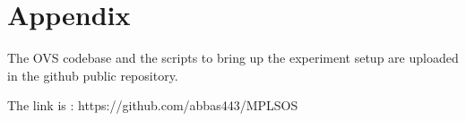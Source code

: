 \chapter*{Appendix}

The OVS codebase and the scripts to bring up the experiment setup are uploaded in the github public repository.

The link is : https://github.com/abbas443/MPLSOS


